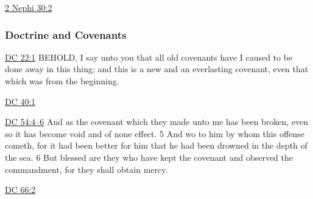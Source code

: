 		
		\begin{compactdesc}
			\item[{\hyperref[2NEPHI-30-2]{2 Nephi 30:2}}]
		\end{compactdesc}
		
	\subsubsection{Doctrine and Covenants} %
		\label{COVENANT-DC}
	
		
		\begin{compactdesc}
			\item[{\hyperref[DC22-1]{DC 22:1}}] BEHOLD, I say unto you that all old covenants have I caused to be done away in this thing; and this is a new and an everlasting covenant, even that which was from the beginning.
			\item[{\hyperref[DC40-1]{DC 40:1}}]
			\item[{\hyperref[DC54-4]{DC 54:4--6}}] And as the covenant which they made unto me has been broken, even so it has become void and of none effect. 5 And wo to him by whom this offense cometh, for it had been better for him that he had been drowned in the depth of the sea. 6 But blessed are they who have kept the covenant and observed the commandment, for they shall obtain mercy.
			\item[{\hyperref[DC66-2]{DC 66:2}}]
		\end{compactdesc}
		
	
		
		
